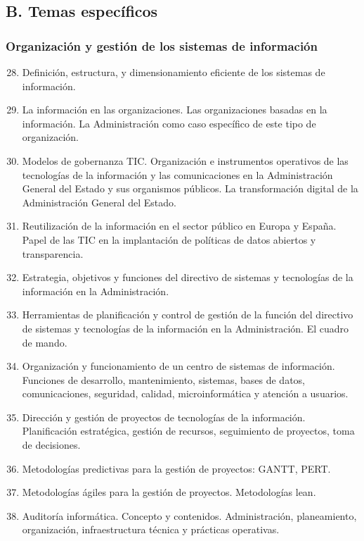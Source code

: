 \subsection{B. Temas específicos}
	\subsubsection{Organización y gestión de los sistemas de información}
	\begin{enumerate}
		\setcounter{enumi}{27}
		\item Definición, estructura, y dimensionamiento eficiente de los sistemas de información.
		\item La información en las organizaciones. Las organizaciones basadas en la información. La Administración como caso específico de este tipo de organización.
		\item Modelos de gobernanza TIC. Organización e instrumentos operativos de las tecnologías de la información y las comunicaciones en la Administración General del Estado y sus organismos públicos. La transformación digital de la Administración General del Estado.
		\item Reutilización de la información en el sector público en Europa y España. Papel de las TIC en la implantación de políticas de datos abiertos y transparencia.
		\item Estrategia, objetivos y funciones del directivo de sistemas y tecnologías de la información en la Administración.
		\item Herramientas de planificación y control de gestión de la función del directivo de sistemas y tecnologías de la información en la Administración. El cuadro de mando.
		\item Organización y funcionamiento de un centro de sistemas de información. Funciones de desarrollo, mantenimiento, sistemas, bases de datos, comunicaciones, seguridad, calidad, microinformática y atención a usuarios.
		\item Dirección y gestión de proyectos de tecnologías de la información. Planificación estratégica, gestión de recursos, seguimiento de proyectos, toma de decisiones.
		\item Metodologías predictivas para la gestión de proyectos: GANTT, PERT.
		\item Metodologías ágiles para la gestión de proyectos. Metodologías lean.
		\item Auditoría informática. Concepto y contenidos. Administración, planeamiento, organización, infraestructura técnica y prácticas operativas.

\end{enumerate}

